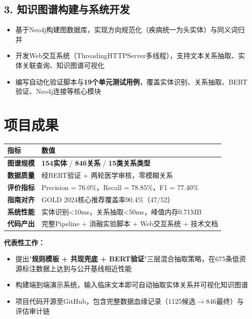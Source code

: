 \documentclass[11pt,a4paper]{article}
\begin{document}
\subsection*{3. 知识图谱构建与系统开发}
\begin{itemize}
    \item 基于Neo4j构建图数据库，实现方向规范化（疾病统一为头实体）与同义词归并
    \item 开发Web交互系统（ThreadingHTTPServer多线程），支持文本关系抽取、实体关联查询、知识图谱可视化
    \item 编写自动化验证脚本与\textbf{19个单元测试用例}，覆盖实体识别、关系抽取、BERT验证、Neo4j连接等核心模块
\end{itemize}

\section{项目成果}

\begin{table}[h]
\centering
\renewcommand{\arraystretch}{1.3}
\begin{tabularx}{\textwidth}{>{\bfseries}l X}
\toprule
指标 & 数值 \\
\midrule
图谱规模 & \textbf{154实体} / \textbf{846关系} / \textbf{15类关系类型} \\
数据质量 & 经BERT验证 + 两轮医学审核，零模糊关系 \\
评价指标 & Precision = 76.0\%，Recall = 78.85\%，F1 = 77.40\% \\
指南对齐 & GOLD 2024核心推荐覆盖率90.4\%（47/52） \\
系统性能 & 实体识别<10ms，关系抽取<50ms，峰值内存0.71MB \\
代码产出 & 完整Pipeline + 消融实验脚本 + Web交互系统 + 技术文档 \\
\bottomrule
\end{tabularx}
\end{table}

\vspace{4pt}
\noindent\textbf{代表性工作：}
\begin{itemize}
    \item 提出"\textbf{规则模板 + 共现兜底 + BERT验证}"三层混合抽取策略，在675条低资源标注数据上达到与公开基线相近性能
    \item 构建端到端演示系统，输入临床文本即可自动抽取实体关系并可视化知识图谱
    \item 项目代码开源至GitHub，包含完整数据血缘记录（1125候选$\rightarrow$846最终）与评估审计链
\end{itemize}
\end{document}

